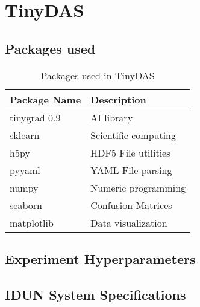\chapter{TinyDAS}
\label{app:tinydas-exp}

\section{Packages used}
\label{app:tinypacks}

%

\begin{table}[!htbp]
\centering
\caption{Packages used in TinyDAS}
\label{tab:tinydas-packages}
\small
\begin{tabular}{>{\raggedright\arraybackslash}p{}>{\raggedright\arraybackslash}p{}}
\toprule
\textbf{Package Name} & \textbf{Description} \\
\midrule
\rowcolor{gray!10} tinygrad 0.9 & AI library \\
\rowcolor{gray!10} sklearn & Scientific computing \\
h5py & HDF5 File utilities \\
\rowcolor{gray!10} pyyaml & YAML File parsing \\
numpy & Numeric programming \\
\rowcolor{gray!10} seaborn & Confusion Matrices \\
matplotlib & Data visualization \\
\bottomrule
\end{tabular}
\end{table}
\clearpage
\section{Experiment Hyperparameters}
\label{app:hyper}


%

\section{IDUN System Specifications}
\label{app:idun}

